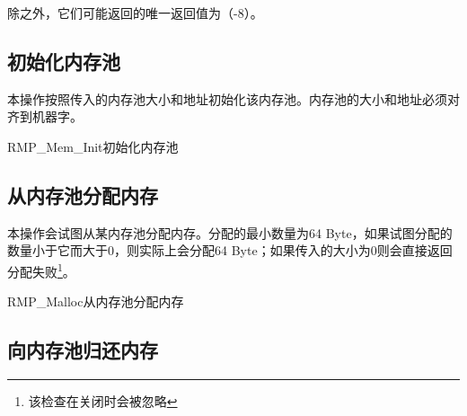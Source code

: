 除之外，它们可能返回的唯一返回值为（-8）。

\subsection{初始化内存池}\label{subsec:initialise-a-memory-pool}

本操作按照传入的内存池大小和地址初始化该内存池。内存池的大小和地址必须对齐到机器字。

\begin{apidesc}{RMP\_Mem\_Init}{初始化内存池}
    \begin{apiparams}
    \end{apiparams}
    \begin{apiret}
    \end{apiret}
\end{apidesc}

\subsection{从内存池分配内存}\label{subsec:allocate-from-a-memory-pool}

本操作会试图从某内存池分配内存。分配的最小数量为64
Byte，如果试图分配的数量小于它而大于0，则实际上会分配64
Byte；如果传入的大小为0则会直接返回分配失败\footnote{该检查在关闭时会被忽略}。

\begin{apidesc}{RMP\_Malloc}{从内存池分配内存}
    \begin{apiparams}
    \end{apiparams}
    \begin{apiret}
    \end{apiret}
\end{apidesc}

\subsection{向内存池归还内存}\label{subsec:return-memory-to-a-memory-pool}

